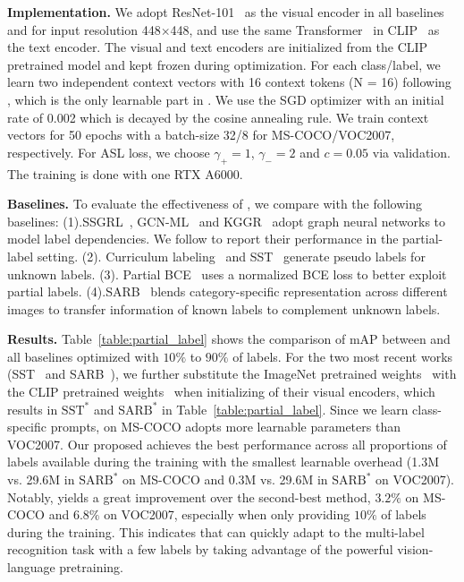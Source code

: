 \textbf{Implementation.} We adopt ResNet-101~\cite{he2016deep} as the visual encoder in all baselines and \ours for input resolution 448$\times$448,  and use the same Transformer~\cite{radford2019language,vaswani2017attention} in CLIP~\cite{radford2021learning} as the text encoder. The visual and text encoders are initialized from the CLIP pretrained model and kept frozen during optimization. For each class/label, we learn two independent context vectors with 16 context tokens (N = 16) following \cite{zhou2021learning}, which is the only learnable part in \ours. We use the SGD optimizer with an initial rate of 0.002 which is decayed by the cosine annealing rule. We train context vectors for 50 epochs with a batch-size 32/8 for MS-COCO/VOC2007, respectively. For ASL loss, we choose $\gamma_{+} = 1$, $\gamma_{-}=2$ and $c=0.05$ via validation. The training is done with one RTX A6000.

\textbf{Baselines.} To evaluate the effectiveness of \ours, we compare with the following baselines: (1).SSGRL~\cite{chen2019learning}, GCN-ML~\cite{chen2019multi} and KGGR~\cite{chen2020knowledge} adopt graph neural networks to model label dependencies. We follow \cite{chen2022structured} to report their performance in the partial-label setting. (2). Curriculum labeling~\cite{durand2019learning} and  SST~\cite{chen2022structured} generate pseudo labels for unknown labels. (3). Partial BCE~\cite{durand2019learning} uses a normalized BCE loss to better exploit partial labels. (4).SARB~\cite{pu2022semantic} blends category-specific representation across different images to transfer information of known labels to complement unknown labels.


\textbf{Results.} 
Table~\ref{table:partial_label} shows the comparison of mAP between \ours and all baselines optimized with $10\%$ to $90\%$ of labels. For the two most recent works (SST~\cite{chen2022structured} and SARB~\cite{pu2022semantic}), we further substitute the ImageNet pretrained weights~\cite{he2016deep} with the CLIP pretrained weights~\cite{radford2021learning} when initializing of their visual encoders, which results in $\text{SST}^*$ and $\text{SARB}^*$ in Table~\ref{table:partial_label}. Since we learn class-specific prompts, \ours on MS-COCO adopts more learnable parameters than VOC2007. Our proposed \ours achieves the best performance across all  proportions of labels available during the training with the smallest learnable overhead (1.3M vs. 29.6M in $\text{SARB}^*$ on MS-COCO and 0.3M vs. 29.6M in $\text{SARB}^*$ on VOC2007). Notably, \ours yields a great improvement over the second-best method, $3.2\%$ on MS-COCO and $6.8\%$ on VOC2007,  especially when only providing $10\%$ of labels during the training. This indicates that \ours can quickly adapt to the multi-label recognition task with a few labels by taking advantage of the powerful vision-language pretraining.

